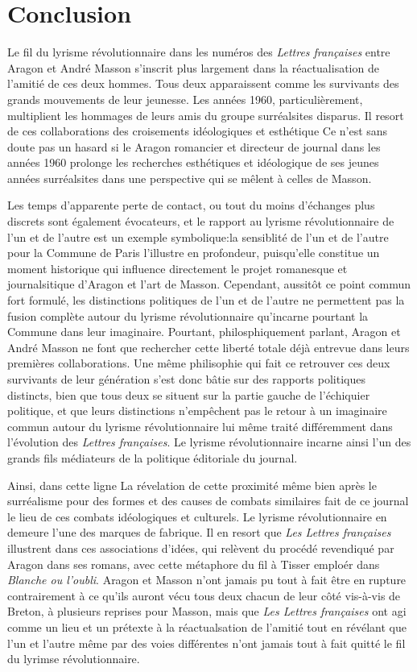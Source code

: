 \chapter*{Conclusion} 
Le fil du lyrisme révolutionnaire dans les numéros des \emph{Lettres françaises} entre Aragon et André Masson s'inscrit plus largement dans la réactualisation de l'amitié de ces deux hommes. Tous deux apparaissent comme les survivants des grands mouvements de leur jeunesse. Les années 1960, particulièrement, multiplient les hommages de leurs amis du groupe surréalsites disparus. Il resort de ces collaborations des croisements idéologiques et esthétique Ce n'est sans doute pas un hasard si le Aragon romancier et directeur de journal dans les années 1960 prolonge les recherches esthétiques et idéologique de ses jeunes années surréalsites dans une perspective qui se mêlent à celles de Masson. 

Les temps d'apparente perte de contact, ou tout du moins d'échanges plus discrets sont également évocateurs, et le rapport au lyrisme révolutionnaire de l'un et de l'autre est un exemple symbolique:la sensiblité de l'un et de l'autre pour la Commune de Paris l'illustre en profondeur, puisqu'elle constitue un moment historique qui influence directement le projet romanesque et journalsitique d'Aragon et l'art de Masson. Cependant, aussitôt ce point commun fort formulé, les distinctions politiques de l'un et de l'autre ne permettent pas la fusion complète autour du lyrisme révolutionnaire qu'incarne pourtant la Commune dans leur imaginaire. Pourtant, philosphiquement parlant, Aragon et André Masson ne font que rechercher cette liberté totale déjà entrevue dans leurs premières collaborations. Une même philisophie qui fait ce retrouver ces deux survivants de leur génération s'est donc bâtie sur des rapports politiques distincts, bien que tous deux se situent sur la partie gauche de l'échiquier politique, et que leurs distinctions n'empêchent pas le retour à un imaginaire commun autour du lyrisme révolutionnaire lui même traité différemment dans l'évolution des \emph{Lettres françaises}. Le lyrisme révolutionnaire incarne ainsi l'un des grands fils médiateurs de la politique éditoriale du journal.

Ainsi, dans cette ligne La révelation de cette proximité même bien après le surréalisme pour des formes et des causes de combats similaires  fait de ce journal le lieu de ces combats idéologiques et culturels. Le lyrisme révolutionnaire en demeure l'une des marques de fabrique. Il en resort que \emph{Les Lettres françaises} illustrent dans ces associations d'idées, qui relèvent du procédé revendiqué par Aragon dans ses romans, avec cette métaphore du fil à Tisser emploér dans \emph{Blanche ou l'oubli}. Aragon et Masson n'ont jamais pu tout à fait être en rupture contrairement à ce qu'ils auront vécu tous deux chacun de leur côté vis-à-vis de Breton, à plusieurs reprises pour Masson, mais que \emph{Les Lettres françaises} ont agi comme un lieu et un prétexte à la réactualsation de l'amitié  tout en révélant que l'un et l'autre même par des voies différentes n'ont jamais tout à fait quitté le fil du lyrimse révolutionnaire. 


